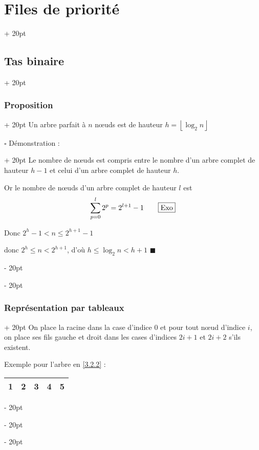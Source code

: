 \documentclass[a4paper, 12pt, twoside]{article}
\newcommand{\floor}[1]{\left\lfloor #1 \right\rfloor}
\renewcommand{\le}{\leqslant}
\newcommand{\ind}[1][20pt]{\advance\leftskip + #1}
\newcommand{\deind}[1][20pt]{\advance\leftskip - #1}
\newenvironment{indt}[2][20pt]{#2 \par \ind[#1]}{\par \deind} %
\begin{document}
\begin{indt}{\section{Files de priorité}}
\begin{indt}{\subsection{Tas binaire}}
            \vspace{12pt}
            
            \begin{indt}{\subsubsection{Proposition}}
                Un arbre parfait à $n$ n\oe uds est de hauteur $h = \floor{\log_2 n}$
                
                \begin{indt}{$\square$ Démonstration :}
                    Le nombre de n\oe uds est compris entre le nombre d'un arbre complet de hauteur $h - 1$ et celui d'un arbre complet de hauteur $h$.
                    
                    Or le nombre de n\oe uds d'un arbre complet de hauteur $l$ est
                        \[ \sum_{p = 0}^{l} 2^p = 2^{l + 1} - 1 \qquad \boxed{\rm Exo} \]
                    
                    Donc $2^h - 1 < n \le 2^{h + 1} - 1$
                    
                    donc $2^h \le n < 2^{h + 1}$, d'où $h \le \log_2 n < h + 1$ $\blacksquare$
                \end{indt}
            \end{indt}
            
            \vspace{12pt}
            
            \begin{indt}{\subsubsection{Représentation par tableaux}}
                On place la racine dans la case d'indice 0 et pour tout n\oe ud d'indice $i$, on place ses fils gauche et droit dans les cases d'indices $2i + 1$ et $2i + 2$ s'ils existent.
                
                \vspace{12pt}
                
                Exemple pour l'arbre en \ref{3.2.2} : 
                \begin{tabular}{|c|c|c|c|c|}
                    \hline
                    1 & 2 & 3 & 4 & 5
                    \\
                    \hline
                \end{tabular}
                

\end{indt}
\end{indt}
\end{indt}
\end{document}
